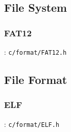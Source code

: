 
\subsection{File System}

\subsubsection{FAT12}

: \verb`c/format/FAT12.h`


\subsection{File Format}

\subsubsection{ELF}

: \verb`c/format/ELF.h`




